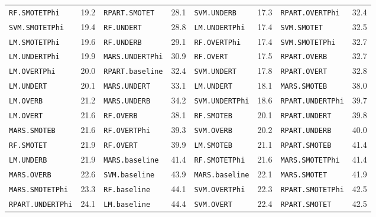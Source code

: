 \begin{table}[t]
{{\begin{tabular}{lclclclc}
\texttt{RF.SMOTETPhi} & 19.2 & \texttt{RPART.SMOTET} & 28.1 & \texttt{SVM.UNDERB} & 17.3 & \texttt{RPART.OVERTPhi} & 32.4 \\
\texttt{SVM.SMOTETPhi} & 19.4 & \texttt{RF.UNDERT} & 28.8 & \texttt{LM.UNDERTPhi} & 17.4 & \texttt{SVM.SMOTET} & 32.5 \\
\texttt{LM.SMOTETPhi} & 19.6 & \texttt{RF.UNDERB} & 29.1 & \texttt{RF.OVERTPhi} & 17.4 & \texttt{SVM.SMOTETPhi} & 32.7 \\
\texttt{LM.UNDERTPhi} & 19.9 & \texttt{MARS.UNDERTPhi} & 30.9 & \texttt{RF.OVERT} & 17.5 & \texttt{RPART.OVERB} & 32.7 \\
\texttt{LM.OVERTPhi} & 20.0 & \texttt{RPART.baseline} & 32.4 & \texttt{SVM.UNDERT} & 17.8 & \texttt{RPART.OVERT} & 32.8 \\
\texttt{LM.UNDERT} & 20.1 & \texttt{MARS.UNDERT} & 33.1 & \texttt{LM.UNDERT} & 18.1 & \texttt{MARS.SMOTEB} & 38.0 \\
\texttt{LM.OVERB} & 21.2 & \texttt{MARS.UNDERB} & 34.2 & \texttt{SVM.UNDERTPhi} & 18.6 & \texttt{RPART.UNDERTPhi} & 39.7 \\
\texttt{LM.OVERT} & 21.6 & \texttt{RF.OVERB} & 38.1 & \texttt{RF.SMOTEB} & 20.1 & \texttt{RPART.UNDERT} & 39.8 \\
\texttt{MARS.SMOTEB} & 21.6 & \texttt{RF.OVERTPhi} & 39.3 & \texttt{SVM.OVERB} & 20.2 & \texttt{RPART.UNDERB} & 40.0 \\
\texttt{RF.SMOTET} & 21.9 & \texttt{RF.OVERT} & 39.9 & \texttt{LM.SMOTEB} & 21.1 & \texttt{RPART.SMOTEB} & 41.4 \\
\texttt{LM.UNDERB} & 21.9 & \texttt{MARS.baseline} & 41.4 & \texttt{RF.SMOTETPhi} & 21.6 & \texttt{MARS.SMOTETPhi} & 41.4 \\
\texttt{MARS.OVERB} & 22.6 & \texttt{SVM.baseline} & 43.9 & \texttt{MARS.baseline} & 22.1 & \texttt{MARS.SMOTET} & 41.9 \\
\texttt{MARS.SMOTETPhi} & 23.3 & \texttt{RF.baseline} & 44.1 & \texttt{SVM.OVERTPhi} & 22.3 & \texttt{RPART.SMOTETPhi} & 42.5 \\
\texttt{RPART.UNDERTPhi} & 24.1 & \texttt{LM.baseline} & 44.4 & \texttt{SVM.OVERT} & 22.4 & \texttt{RPART.SMOTET} & 42.5 \\
\bottomrule
\end{tabular}%
}%
}
\end{table}
